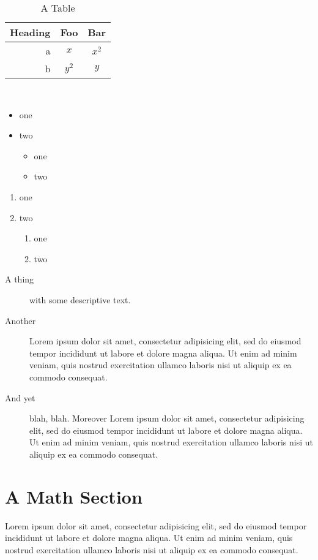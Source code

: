 \documentclass{amsart}
\theoremstyle{definition}
\theoremstyle{remark}
\numberwithin{equation}{section}
\begin{document}
\begin{table}
\begin{centering}
\caption{A Table}
\begin{tabular}{r|cc}
Heading & Foo & Bar\\\hline
a & $x$ & $x^2$\\
b & $y^2$ & $y$\\
\end{tabular}\\
\end{centering}
\end{table}

\begin{itemize}
 \item one
 \item two
   \begin{itemize}
    \item one
    \item two
   \end{itemize}
\end{itemize}

\begin{enumerate}
 \item one
 \item two
   \begin{enumerate}
    \item one
    \item two
   \end{enumerate}
\end{enumerate}

\begin{description}
\item[A thing] with some descriptive text.
\item[Another] Lorem ipsum dolor sit amet, consectetur adipisicing elit, sed do eiusmod tempor incididunt ut labore et dolore magna aliqua. Ut enim ad minim veniam, quis nostrud exercitation ullamco laboris nisi ut aliquip ex ea commodo consequat. 
\item[And yet] blah, blah. Moreover
Lorem ipsum dolor sit amet, consectetur adipisicing elit, sed do eiusmod tempor incididunt ut labore et dolore magna aliqua. Ut enim ad minim veniam, quis nostrud exercitation ullamco laboris nisi ut aliquip ex ea commodo consequat. 
\end{description}

\section{A Math Section}
Lorem ipsum dolor sit amet, consectetur adipisicing elit, sed do eiusmod tempor incididunt ut labore et dolore magna aliqua. Ut enim ad minim veniam, quis nostrud exercitation ullamco laboris nisi ut aliquip ex ea commodo consequat.
\end{document}
